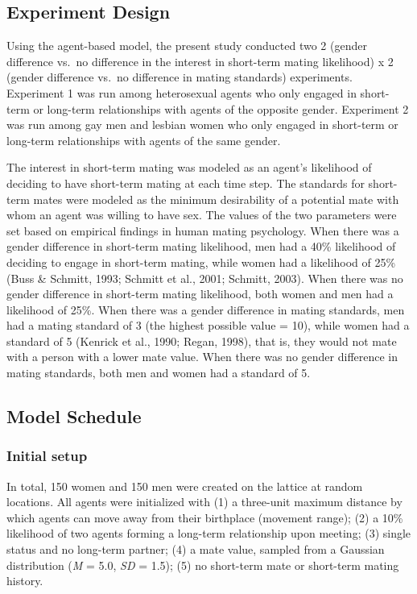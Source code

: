 \documentclass[
  11pt,
]{article}
\begin{document}
\hypertarget{experiment-design}{%
\subsection{Experiment Design}\label{experiment-design}}

Using the agent-based model, the present study conducted two 2 (gender
difference vs.~no difference in the interest in short-term mating
likelihood) x 2 (gender difference vs.~no difference in mating
standards) experiments. Experiment 1 was run among heterosexual agents
who only engaged in short-term or long-term relationships with agents of
the opposite gender. Experiment 2 was run among gay men and lesbian
women who only engaged in short-term or long-term relationships with
agents of the same gender.

The interest in short-term mating was modeled as an agent's likelihood
of deciding to have short-term mating at each time step. The standards
for short-term mates were modeled as the minimum desirability of a
potential mate with whom an agent was willing to have sex. The values of
the two parameters were set based on empirical findings in human mating
psychology. When there was a gender difference in short-term mating
likelihood, men had a 40\% likelihood of deciding to engage in
short-term mating, while women had a likelihood of 25\% (Buss \&
Schmitt, 1993; Schmitt et al., 2001; Schmitt, 2003). When there was no
gender difference in short-term mating likelihood, both women and men
had a likelihood of 25\%. When there was a gender difference in mating
standards, men had a mating standard of 3 (the highest possible value =
10), while women had a standard of 5 (Kenrick et al., 1990; Regan,
1998), that is, they would not mate with a person with a lower mate
value. When there was no gender difference in mating standards, both men
and women had a standard of 5.

\hypertarget{model-schedule}{%
\subsection{Model Schedule}\label{model-schedule}}

\hypertarget{initial-setup}{%
\subsubsection{Initial setup}\label{initial-setup}}

In total, 150 women and 150 men were created on the lattice at random
locations. All agents were initialized with (1) a three-unit maximum
distance by which agents can move away from their birthplace (movement
range); (2) a 10\% likelihood of two agents forming a long-term
relationship upon meeting; (3) single status and no long-term partner;
(4) a mate value, sampled from a Gaussian distribution (\emph{M} = 5.0,
\emph{SD} = 1.5); (5) no short-term mate or short-term mating history.
\end{document}
